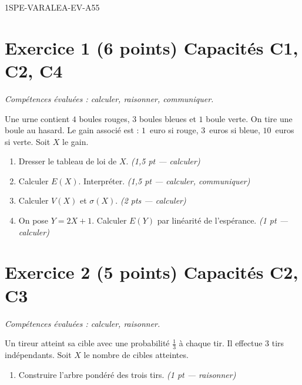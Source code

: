 \begin{evaluation}{1SPE-VARALEA-EV-A}{55}

\section*{Exercice 1 \hfill (6 points) \hfill Capacités C1, C2, C4}

\textit{Compétences évaluées : calculer, raisonner, communiquer.}

\medskip
Une urne contient $4$ boules rouges, $3$ boules bleues et $1$ boule verte. On tire une boule au hasard. Le gain associé est : $1$~euro si rouge, $3$~euros si bleue, $10$~euros si verte. Soit $X$ le gain.

\begin{enumerate}
  \item Dresser le tableau de loi de $X$.
  \hfill\textit{(1{,}5 pt — calculer)}

  \item Calculer $E(X)$. Interpréter.
  \hfill\textit{(1{,}5 pt — calculer, communiquer)}

  \item Calculer $V(X)$ et $\sigma(X)$.
  \hfill\textit{(2 pts — calculer)}

  \item On pose $Y = 2X + 1$. Calculer $E(Y)$ par linéarité de l'espérance.
  \hfill\textit{(1 pt — calculer)}

\end{enumerate}

\section*{Exercice 2 \hfill (5 points) \hfill Capacités C2, C3}

\textit{Compétences évaluées : calculer, raisonner.}

\medskip
Un tireur atteint sa cible avec une probabilité $\frac{1}{3}$ à chaque tir. Il effectue $3$ tirs indépendants. Soit $X$ le nombre de cibles atteintes.

\begin{enumerate}
  \item Construire l'arbre pondéré des trois tirs.
  \hfill\textit{(1 pt — raisonner)}


\end{enumerate}
\end{evaluation}
